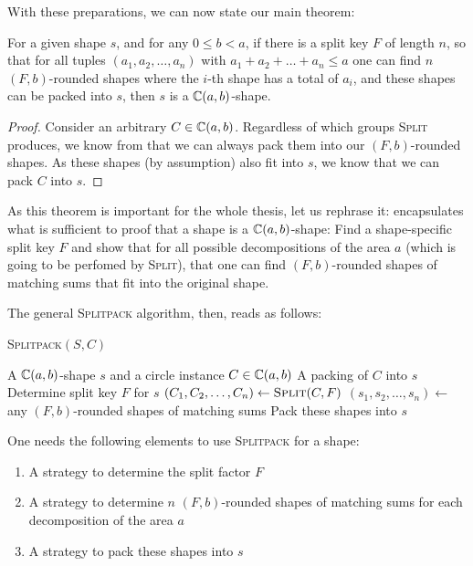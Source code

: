 \documentclass[%
    a4paper,              %
    style=screen,          %
    bibliography=totoc,   %
    nexus,                %
    lnum,                 %
    extramargin,          %
]{tubsbook}
\begin{document}
With these preparations, we can now state our main theorem:

\begin{theorem}\label{th:splitpack}
    For a given shape $s$, and for any $0 \le b < a$, if there is a split key $F$ of length $n$, so that for all tuples $(a_1, a_2, \dots, a_n)$ with $a_1 + a_2 + \dots + a_n \le a$
    one can find $n$ $(F,b)$-rounded shapes where the $i$-th shape has a total of $a_i$, and these shapes can be packed into $s$, then $s$ is a $\mathbb{C}(a,b)$-shape.
\end{theorem}

\begin{proof}
    Consider an arbitrary $C \in \mathbb{C}(a,b)$. Regardless of which groups \textsc{Split} produces, we know from  that we can always pack them into our $(F,b)$-rounded shapes. As these shapes (by assumption) also fit into $s$, we know that we can pack $C$ into $s$.
\end{proof}

As this theorem is important for the whole thesis, let us rephrase it:  encapsulates what is sufficient to proof that a shape is a $\mathbb{C}(a,b)$-shape: Find a shape-specific split key $F$ and show that for all possible decompositions of the area $a$ (which is going to be perfomed by \textsc{Split}), that one can find $(F,b)$-rounded shapes of matching sums that fit into the original shape.

The general \textsc{Splitpack} algorithm, then, reads as follows:

\begin{algorithm}[htbp!]
    \caption{\textsc{Splitpack}$(S,C)$}
    \begin{algorithmic}
        \Require A $\mathbb{C}(a,b)$-shape $s$ and a circle instance $C \in \mathbb{C}(a,b)$
        \Ensure A packing of $C$ into $s$
        \State Determine split key $F$ for $s$
        \State $(C_1, C_2, \dots, C_n) \gets \textsc{Split}(C,F)$
        \State $(s_1, s_2, \dots, s_n) \gets$ any $(F,b)$-rounded shapes of matching sums
        \State Pack these shapes into $s$
            \State {}
        \EndFor
    \end{algorithmic}
\end{algorithm}

One needs the following elements to use \textsc{Splitpack} for a shape:

\begin{enumerate}
    \item A strategy to determine the split factor $F$
    \item A strategy to determine $n$ $(F,b)$-rounded shapes of matching sums for each decomposition of the area $a$
    \item A strategy to pack these shapes into $s$
\end{enumerate}
\end{document}
